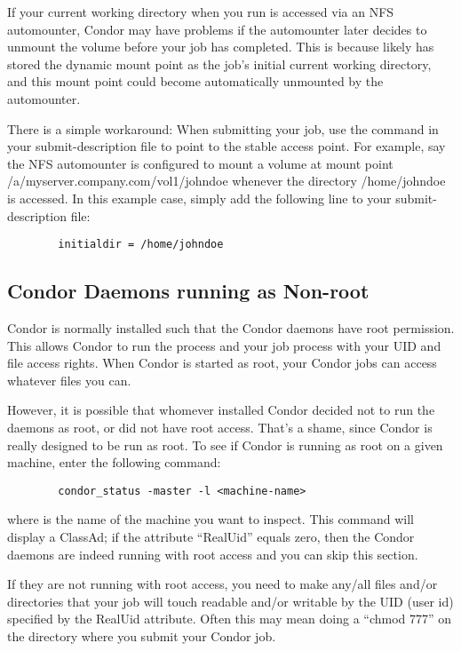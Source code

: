 If your current working directory when you run  is
accessed via an NFS automounter, Condor may have problems if the
automounter later decides to unmount the volume before your job has
completed.  This is because  likely has stored the
dynamic mount point as the job's initial current working directory, and
this mount point could become automatically unmounted by the
automounter.

There is a simple workaround: When submitting your job, use the 
 command in your submit-description file to point to
the stable access point.  For example,
say the NFS automounter is configured to mount a volume at mount point
/a/myserver.company.com/vol1/johndoe whenever the directory /home/johndoe is
accessed.  In this example case, simply add the following line to your 
submit-description file:
\begin{verbatim}
        initialdir = /home/johndoe
\end{verbatim}

\subsection{Condor Daemons running as Non-root}

Condor is normally installed such that the Condor daemons have root
permission.  This allows Condor to run the  process and
your job process with your UID and file access rights.  When Condor
is started as root, your Condor jobs can access whatever files you can.

However, it is possible that whomever installed Condor decided not to
run the daemons as root, or did not have root access.  That's a shame, 
since Condor is really designed to be run as root.  To see if Condor is
running as root on a given machine, enter the following command:
\begin{verbatim}
        condor_status -master -l <machine-name>
\end{verbatim}
where  is the name of the machine you want to inspect.
This command will display a  ClassAd; if the attribute ``RealUid'' equals
zero, then the Condor daemons are indeed running with root access and
you can skip this section.  

If they are not running with root access, you need to make any/all files
and/or directories that your job will touch readable and/or writable by
the UID (user id) specified by the RealUid attribute.  Often this may
mean doing a ``chmod 777'' on the directory where you submit your Condor
job.

